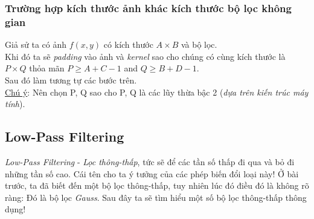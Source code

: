 \documentclass{article}
\begin{document}
            
        \subsubsection*{Trường hợp kích thước ảnh khác kích thước bộ lọc không gian}
        Giả sử ta có ảnh $f(x,y)$ có kích thước $A\times B$ và bộ lọc.\\
        Khi đó ta sẽ \textit{padding} vào ảnh và \textit{kernel} sao cho chúng có cùng kích thước là $P \times Q$ thỏa mãn $P \geq A+C-1$ and $Q \geq B+D-1$.\\
        Sau đó làm tương tự các bước trên.\\
        \underline{Chú ý}: Nên chọn P, Q sao cho P, Q là các lũy thừa bậc 2 (\textit{dựa trên kiến trúc máy tính}). 
        \subsection{Low-Pass Filtering}
        \textit{Low-Pass Filtering} - \textit{Lọc thông-thấp}, tức sẽ để các tần số thấp đi qua và bỏ đi những tần số cao. Cái tên cho ta ý tưởng của các phép biến đổi loại này! Ở bài trước, ta đã biết đến một bộ lọc thông-thấp, tuy nhiên lúc đó điều đó là không rõ ràng: Đó là bộ lọc \textit{Gauss}. Sau đây ta sẽ tìm hiểu một số bộ lọc thông-thấp thông dụng!
\end{document}
